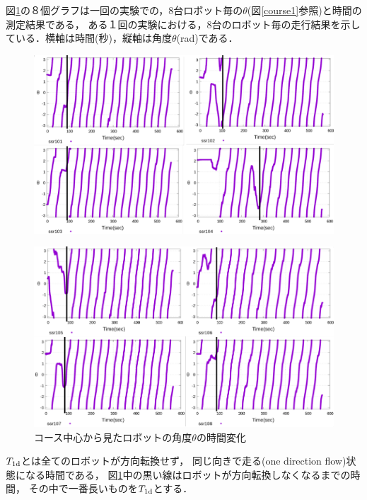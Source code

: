 図\ref{fig:ssr}の８個グラフは一回の実験での，8台ロボット毎の$\theta$(図\ref{course1}参照)と時間の測定結果である，
ある１回の実験における，8台のロボット毎の走行結果を示している．横軸は時間($秒$)，縦軸は角度$\theta$(rad)である．

\begin{figure}[!ht]
     \centering
     \includegraphics[width=1.0\linewidth]{ssr4_1.png}
\end{figure}

\vspace{-8mm}
\begin{figure}[!ht]\label{ssr2}
     \centering
     \includegraphics[width=1.0\linewidth]{ssr4_2.png}
     \caption{コース中心から見たロボットの角度$\theta$の時間変化}
     \label{fig:ssr}
\end{figure}


$T_{\rm 1d}$とは全てのロボットが方向転換せず，
同じ向きで走る(one direction flow)状態になる時間である，
図\ref{fig:ssr}中の黒い線はロボットが方向転換しなくなるまでの時間，
その中で一番長いものを$T_{\rm 1d}$とする．




